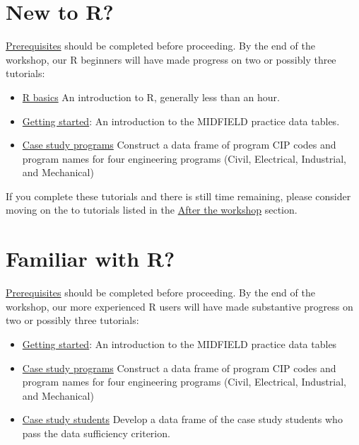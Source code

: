 \documentclass[
]{book}
\providecommand{\tightlist}{%
  \setlength{\itemsep}{0pt}\setlength{\parskip}{0pt}}
\begin{document}
\hypertarget{new-to-r}{%
\section{New to R?}\label{new-to-r}}

\protect\hyperlink{prerequisites}{Prerequisites} should be completed before proceeding. By the end of the workshop, our R beginners will have made progress on two or possibly three tutorials:

\begin{itemize}
\tightlist
\item
  \protect\hyperlink{r-basics}{R basics} An introduction to R, generally less than an hour.
\item
  \href{https://midfieldr.github.io/midfieldr/articles/art-000-getting-started.html}{Getting started}: An introduction to the MIDFIELD practice data tables.
\item
  \href{https://midfieldr.github.io/midfieldr/articles/art-110-case-study-programs.html}{Case study programs} Construct a data frame of program CIP codes and program names for four engineering programs (Civil, Electrical, Industrial, and Mechanical)
\end{itemize}

If you complete these tutorials and there is still time remaining, please consider moving on the to tutorials listed in the \protect\hyperlink{after-the-workshop}{After the workshop} section.

\hypertarget{familiar-with-r}{%
\section{Familiar with R?}\label{familiar-with-r}}

\protect\hyperlink{prerequisites}{Prerequisites} should be completed before proceeding. By the end of the workshop, our more experienced R users will have made substantive progress on two or possibly three tutorials:

\begin{itemize}
\tightlist
\item
  \href{https://midfieldr.github.io/midfieldr/articles/art-000-getting-started.html}{Getting started}: An introduction to the MIDFIELD practice data tables\\
\item
  \href{https://midfieldr.github.io/midfieldr/articles/art-110-case-study-programs.html}{Case study programs} Construct a data frame of program CIP codes and program names for four engineering programs (Civil, Electrical, Industrial, and Mechanical)
\item
  \href{https://midfieldr.github.io/midfieldr/articles/art-120-case-study-students.html}{Case study students} Develop a data frame of the case study students who pass the data sufficiency criterion.
\end{itemize}
\end{document}
